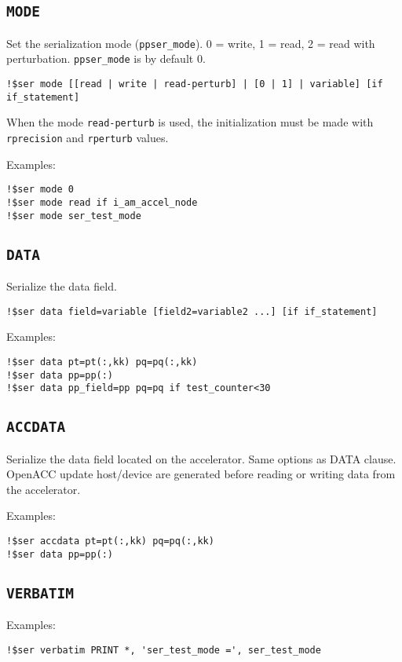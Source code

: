 \documentclass{article}
\begin{document}
\subsection{\texttt{MODE}}
Set the serialization mode (\texttt{ppser\_mode}). 0 = write, 1 = read, 2 = read with perturbation. \texttt{ppser\_mode} is by default 0.

\begin{lstlisting}
!$ser mode [[read | write | read-perturb] | [0 | 1] | variable] [if if_statement]
\end{lstlisting}

When the mode \lstinline!read-perturb! is used, the initialization must be made with \lstinline!rprecision! and \lstinline!rperturb! values.

Examples:
\begin{lstlisting}
!$ser mode 0
!$ser mode read if i_am_accel_node
!$ser mode ser_test_mode
\end{lstlisting}

\subsection{\texttt{DATA}}
Serialize the data field.

\begin{lstlisting}
!$ser data field=variable [field2=variable2 ...] [if if_statement]
\end{lstlisting}

Examples:
\begin{lstlisting}
!$ser data pt=pt(:,kk) pq=pq(:,kk)
!$ser data pp=pp(:) 
!$ser data pp_field=pp pq=pq if test_counter<30
\end{lstlisting}

\subsection{\texttt{ACCDATA}}
Serialize the data field located on the accelerator. Same options as DATA clause.
OpenACC update host/device are generated before reading
or writing data from the accelerator.

Examples:
\begin{lstlisting}
!$ser accdata pt=pt(:,kk) pq=pq(:,kk)
!$ser data pp=pp(:)
\end{lstlisting}

\subsection{\texttt{VERBATIM}}
Examples:
\begin{lstlisting}
!$ser verbatim PRINT *, 'ser_test_mode =', ser_test_mode
\end{lstlisting}
\end{document}
